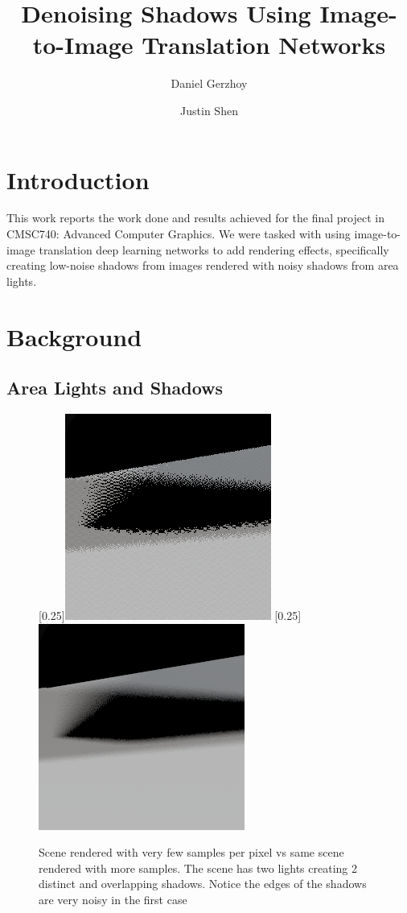 \documentclass[acmsmall]{acmart}
\begin{document}
\title{Denoising Shadows Using Image-to-Image Translation Networks}

\author{Daniel Gerzhoy}
\author{Justin Shen}
\maketitle

\section{Introduction}
\label{sec:intro}

This work reports the work done and results achieved for the final project in CMSC740: Advanced Computer Graphics. We were tasked with using image-to-image translation deep learning networks to add rendering effects, specifically creating low-noise shadows from images rendered with noisy shadows from area lights.

\section{Background}
\label{sec:background}

\subsection{Area Lights and Shadows}

\begin{figure}
	\centering
		[0.25\textwidth]{\includegraphics[width=.25\textwidth]{images/lowresshadow.png}}
	\hspace{.05\textwidth}
		[0.25\textwidth]{\includegraphics[width=.25\textwidth]{images/highresshadow.png}}
	\caption{Scene rendered with very few samples per pixel vs same scene rendered with more samples. The scene has two lights creating 2 distinct and overlapping shadows. Notice the edges of the shadows are very noisy in the first case}	
	\label{f:ShadowNoise}
\end{figure}
\end{document}
